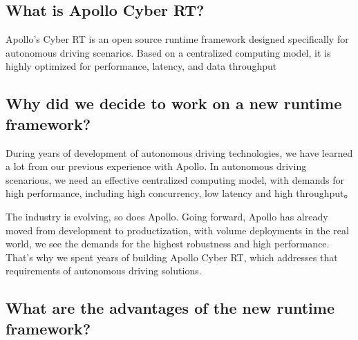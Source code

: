 \subsection*{What is Apollo Cyber R\-T?}

Apollo's Cyber R\-T is an open source runtime framework designed specifically for autonomous driving scenarios. Based on a centralized computing model, it is highly optimized for performance, latency, and data throughput 



\subsection*{Why did we decide to work on a new runtime framework?}


\begin{DoxyItemize}
\item During years of development of autonomous driving technologies, we have learned a lot from our previous experience with Apollo. In autonomous driving scenarious, we need an effective centralized computing model, with demands for high performance, including high concurrency, low latency and high throughput。
\item The industry is evolving, so does Apollo. Going forward, Apollo has already moved from development to productization, with volume deployments in the real world, we see the demands for the highest robustness and high performance. That’s why we spent years of building Apollo Cyber R\-T, which addresses that requirements of autonomous driving solutions. 


\end{DoxyItemize}

\subsection*{What are the advantages of the new runtime framework?}


